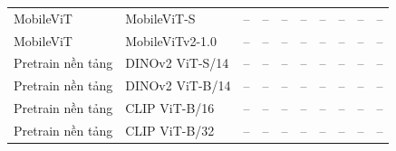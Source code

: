 \begin{table}[t]
\begin{tabular}{llcccccccc}
MobileViT & MobileViT-S & – & – & – & – & – & – & – & – \\
MobileViT & MobileViTv2-1.0 & – & – & – & – & – & – & – & – \\
Pretrain nền tảng & DINOv2 ViT-S/14 & – & – & – & – & – & – & – & – \\
Pretrain nền tảng & DINOv2 ViT-B/14 & – & – & – & – & – & – & – & – \\
Pretrain nền tảng & CLIP ViT-B/16 & – & – & – & – & – & – & – & – \\
Pretrain nền tảng & CLIP ViT-B/32 & – & – & – & – & – & – & – & – \\
\bottomrule
\end{tabular}
\end{table}
